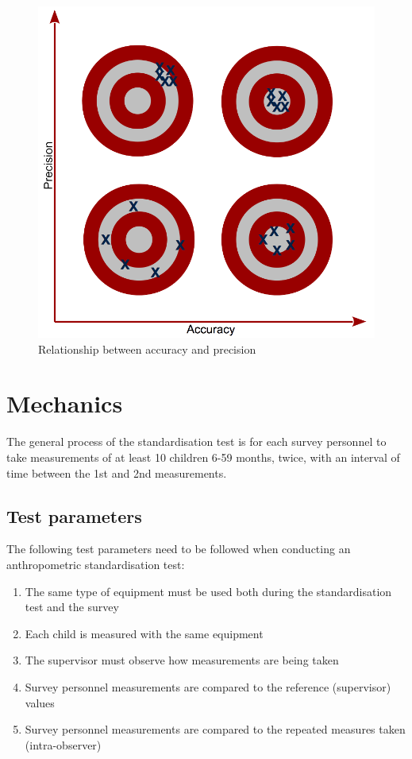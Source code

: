 \documentclass[12pt,]{book}
\theoremstyle{definition}
\theoremstyle{definition}
\theoremstyle{definition}
\theoremstyle{remark}
\begin{document}
\begin{figure}

{\centering \includegraphics[width=11.11in]{images/accuracyPrecision} 

}

\caption{Relationship between accuracy and precision}\label{fig:standard01}
\end{figure}

\hypertarget{mechanics}{%
\section{Mechanics}\label{mechanics}}

The general process of the standardisation test is for each survey
personnel to take measurements of at least 10 children 6-59 months,
twice, with an interval of time between the 1st and 2nd measurements.

\hypertarget{test-parameters}{%
\subsection{Test parameters}\label{test-parameters}}

The following test parameters need to be followed when conducting an
anthropometric standardisation test:

\begin{enumerate}
\def\labelenumi{\arabic{enumi}.}
\item
  The same type of equipment must be used both during the
  standardisation test and the survey
\item
  Each child is measured with the same equipment
\item
  The supervisor must observe how measurements are being taken
\item
  Survey personnel measurements are compared to the reference
  (supervisor) values
\item
  Survey personnel measurements are compared to the repeated measures
  taken (intra-observer)
\end{enumerate}
\end{document}
